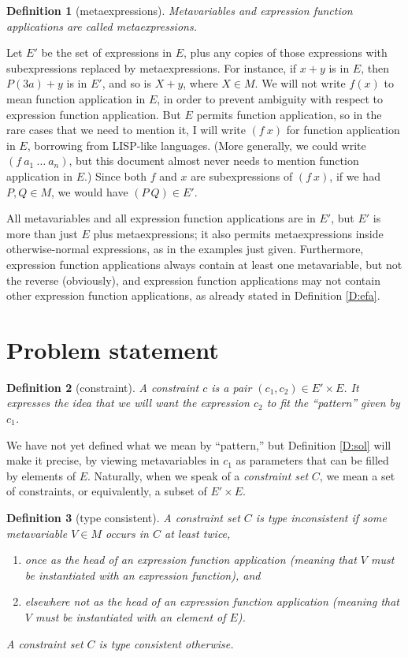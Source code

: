 \documentclass{article}
\newtheorem{dfn}{Definition}
\begin{document}
\begin{dfn}[metaexpressions]
Metavariables and expression function applications are called \emph{metaexpressions}.
\end{dfn}

Let $E'$ be the set of expressions in $E$, plus any copies of those expressions with subexpressions replaced by metaexpressions.  For instance, if $x+y$ is in $E$, then $P(3a)+y$ is in $E'$, and so is $X+y$, where $X\in M$.  We will not write $f(x)$ to mean function application in $E$, in order to prevent ambiguity with respect to expression function application.  But $E$ permits function application, so in the rare cases that we need to mention it, I will write $(f~x)$ for function application in $E$, borrowing from LISP-like languages.  (More generally, we could write $(f~a_1~\ldots~a_n)$, but this document almost never needs to mention function application in $E$.)  Since both $f$ and $x$ are subexpressions of $(f~x)$, if we had $P,Q\in M$, we would have $(P~Q)\in E'$.

All metavariables and all expression function applications are in $E'$, but $E'$ is more than just $E$ plus metaexpressions; it also permits metaexpressions inside otherwise-normal expressions, as in the examples just given.  Furthermore, expression function applications always contain at least one metavariable, but not the reverse (obviously), and expression function applications may not contain other expression function applications, as already stated in Definition \ref{D:efa}.

\section{Problem statement}%

\begin{dfn}[constraint]
A \emph{constraint} $c$ is a pair $(c_1,c_2)\in E'\times E$.  It expresses the idea that we will want the expression $c_2$ to fit the ``pattern'' given by $c_1$.
\end{dfn}

We have not yet defined what we mean by ``pattern,'' but Definition \ref{D:sol} will make it precise, by viewing metavariables in $c_1$ as parameters that can be filled by elements of $E$.  Naturally, when we speak of a \emph{constraint set} $C$, we mean a set of constraints, or equivalently, a subset of $E'\times E$.

\begin{dfn}[type consistent]\label{D:consistent}
A constraint set $C$ is \emph{type inconsistent} if some metavariable $V\in M$ occurs in $C$ at least twice,
\begin{enumerate}
\item	once as the head of an expression function application (meaning that $V$ must be instantiated with an expression function), and
\item	elsewhere \emph{not} as the head of an expression function application (meaning that $V$ must be instantiated with an element of $E$).
\end{enumerate}
A constraint set $C$ is \emph{type consistent} otherwise.
\end{dfn}
\end{document}
